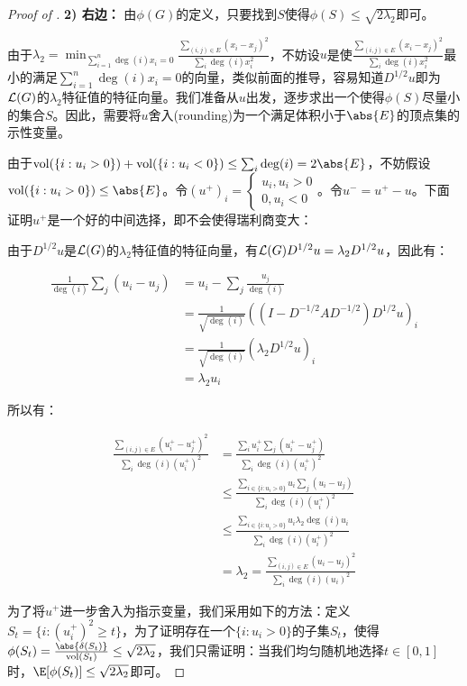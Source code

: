 \begin{proof}[Proof of ]
\textbf{2) 右边：}
由$\phi(G)$的定义，只要找到$S$使得$\phi(S)\leq\sqrt{2\lambda_2}$即可。

由于$\lambda_2=\min_{\sum_{i=1}^n\deg(i)x_i=0}\frac{\sum_{(i,j)\in E}(x_i-x_j)^2}{\sum_{i}\deg(i)x_i^2}$，不妨设$u$是使$\frac{\sum_{(i,j)\in E}(x_i-x_j)^2}{\sum_{i}\deg(i)x_i^2}$最小的满足$\sum_{i=1}^n\deg(i)x_i=0$的向量，类似前面的推导，容易知道$D^{1/2}u$即为$\mathcal{L}(G)$的$\lambda_2$特征值的特征向量。我们准备从$u$出发，逐步求出一个使得$\phi(S)$尽量小的集合$S$。因此，需要将$u$舍入(rounding)为一个满足体积小于$\abs{E}$的顶点集的示性变量。

由于$\vol(\{i:u_i>0\})+\vol(\{i:u_i<0\})\leq\sum_i\deg(i)=2\abs{E}$，不妨假设$\vol(\{i:u_i>0\})\leq\abs{E}$。令$(u^+)_i=\begin{cases}
    u_i,u_i>0\\
    0,u_i<0
\end{cases}$。令$u^-=u^+-u$。下面证明$u^+$是一个好的中间选择，即不会使得瑞利商变大：

由于$D^{1/2}u$是$\mathcal{L}(G)$的$\lambda_2$特征值的特征向量，有$\mathcal{L}(G) D^{1/2}u=\lambda_2D^{1/2}u$，因此有：

\begin{align*}
    \frac{1}{\deg(i)}\sum_{j}(u_i-u_j)&=u_i-\sum_j\frac{u_j}{\deg(i)}\\
    &=\frac{1}{\sqrt{\deg(i)}}\left((I-D^{-1/2}AD^{-1/2})D^{1/2}u\right)_i\\
    &=\frac{1}{\sqrt{\deg(i)}}\left(\lambda_2 D^{1/2}u\right)_i\\
    &=\lambda_2u_i
\end{align*}

所以有：

\begin{align*}
    \frac{\sum_{(i,j)\in E}(u^+_i-u^+_j)^2}{\sum_{i}\deg(i)(u^+_i)^2}&=\frac{\sum_{i}u^+_i\sum_j(u^+_i-u^+_j)}{\sum_{i}\deg(i)(u^+_i)^2}\\
    &\leq\frac{\sum_{i\in\{i:u_i>0\}}u_i\sum_j(u_i-u_j)}{\sum_{i}\deg(i)(u^+_i)^2}\\
    &\leq\frac{\sum_{i\in\{i:u_i>0\}}u_i\lambda_2\deg(i)u_i}{\sum_{i}\deg(i)(u^+_i)^2}\\
    &=\lambda_2=\frac{\sum_{(i,j)\in E}(u_i-u_j)^2}{\sum_{i}\deg(i)(u_i)^2}
\end{align*}

为了将$u^+$进一步舍入为指示变量，我们采用如下的方法：定义$S_t=\{i:(u^+_i)^2\geq t\}$，为了证明存在一个$\{i:u_i>0\}$的子集$S_t$，使得$\phi(S_t)=\frac{\abs{\delta(S_t)}}{\vol(S_t)}\leq\sqrt{2\lambda_2}$，我们只需证明：当我们均匀随机地选择$t\in[0,1]$时，$\E[\phi(S_t)]\leq\sqrt{2\lambda_2}$即可。


\end{proof}
